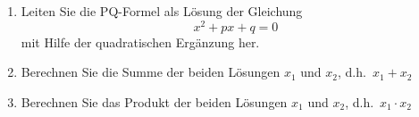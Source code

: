\begin{ExerciseBlock}
\begin{enumerate}[label=\alph*)]
	\item Leiten Sie die PQ-Formel als Lösung der Gleichung \[ \displaystyle x^2+px+q=0 \] mit Hilfe der quadratischen Ergänzung her.
	\item Berechnen Sie die Summe der beiden Lösungen $x_1$ und $x_2$, d.h.~$x_1 + x_2$
	\item Berechnen Sie das Produkt der beiden Lösungen $x_1$ und $x_2$, d.h.~$x_1 \cdot x_2$
\end{enumerate}

\end{ExerciseBlock}
